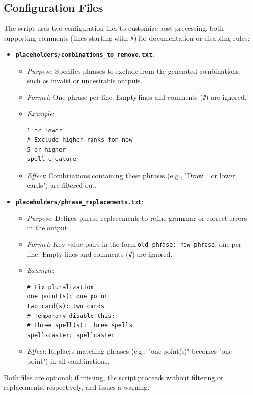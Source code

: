 \subsection{Configuration Files}
The script uses two configuration files to customize post-processing, both supporting comments (lines starting with \texttt{\#}) for documentation or disabling rules:
\begin{itemize}
    \item \textbf{\texttt{placeholders/combinations\_to\_remove.txt}}:
        \begin{itemize}
            \item \textit{Purpose}: Specifies phrases to exclude from the generated combinations, such as invalid or undesirable outputs.
            \item \textit{Format}: One phrase per line. Empty lines and comments (\texttt{\#}) are ignored.
            \item \textit{Example}:
\begin{lstlisting}
1 or lower
# Exclude higher ranks for now
5 or higher
spell creature
\end{lstlisting}
            \item \textit{Effect}: Combinations containing these phrases (e.g., "Draw 1 or lower cards") are filtered out.
        \end{itemize}
    \item \textbf{\texttt{placeholders/phrase\_replacements.txt}}:
        \begin{itemize}
            \item \textit{Purpose}: Defines phrase replacements to refine grammar or correct errors in the output.
            \item \textit{Format}: Key-value pairs in the form \texttt{old phrase: new phrase}, one per line. Empty lines and comments (\texttt{\#}) are ignored.
            \item \textit{Example}:
\begin{lstlisting}
# Fix pluralization
one point(s): one point
two card(s): two cards
# Temporary disable this:
# three spell(s): three spells
spellscaster: spellcaster
\end{lstlisting}
            \item \textit{Effect}: Replaces matching phrases (e.g., "one point(s)" becomes "one point") in all combinations.
        \end{itemize}
\end{itemize}
Both files are optional; if missing, the script proceeds without filtering or replacements, respectively, and issues a warning.


